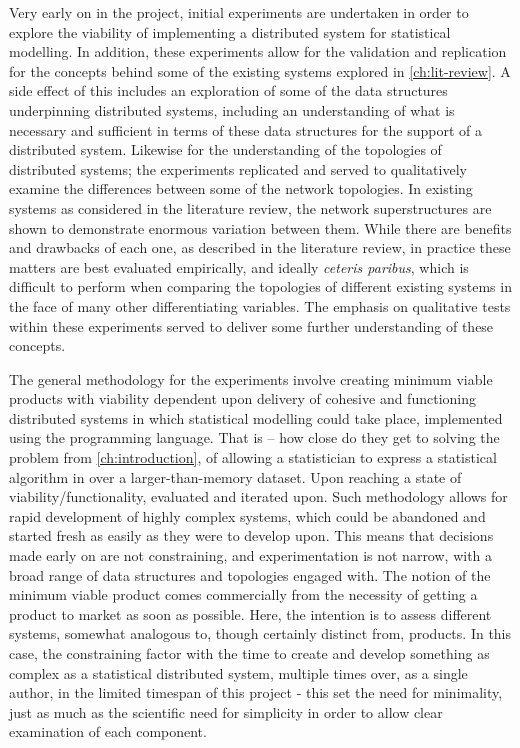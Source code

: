 Very early on in the \lsr{} project, initial experiments are undertaken in order to explore the viability of implementing a distributed system for statistical modelling.
In addition, these experiments allow for the validation and replication for the concepts behind some of the existing systems explored in \cref{ch:lit-review}.
A side effect of this includes an exploration of some of the data structures underpinning distributed systems, including an understanding of what is necessary and sufficient in terms of these data structures for the support of a distributed system.
Likewise for the understanding of the topologies of distributed systems; the experiments replicated and served to qualitatively examine the differences between some of the network topologies.
In existing systems as considered in the literature review, the network superstructures are shown to demonstrate enormous variation between them.
While there are benefits and drawbacks of each one, as described in the literature review, in practice these matters are best evaluated empirically, and ideally \textit{ceteris paribus}, which is difficult to perform when comparing the topologies of different existing systems in the face of many other differentiating variables.
The emphasis on qualitative tests within these experiments served to deliver some further understanding of these concepts.

The general methodology for the experiments involve creating minimum viable products with viability dependent upon delivery of cohesive and functioning distributed systems in which statistical modelling could take place, implemented using the \R{} programming language.
That is -- how close do they get to solving the problem from \cref{ch:introduction}, of allowing a statistician to express a statistical algorithm in \R{} over a larger-than-memory dataset.
Upon reaching a state of viability/functionality, evaluated and iterated upon.
Such methodology allows for rapid development of highly complex systems, which could be abandoned and started fresh as easily as they were to develop upon.
This means that decisions made early on are not constraining, and experimentation is not narrow, with a broad range of data structures and topologies engaged with.
The notion of the minimum viable product comes commercially from the necessity of getting a product to market as soon as possible.
Here, the intention is to assess different systems, somewhat analogous to, though certainly distinct from, products.
In this case, the constraining factor with the time to create and develop something as complex as a statistical distributed system, multiple times over, as a single author, in the limited timespan of this project - this set the need for minimality, just as much as the scientific need for simplicity in order to allow clear examination of each component.

